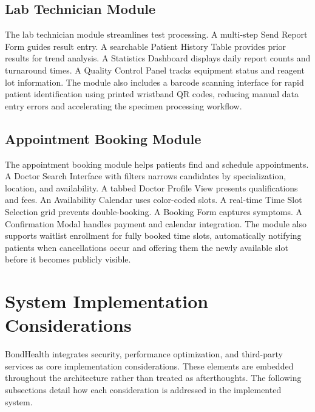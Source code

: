 \subsection{Lab Technician Module}

\justifying
\noindent The lab technician module streamlines test processing. A multi-step Send Report Form guides result entry. A searchable Patient History Table provides prior results for trend analysis. A Statistics Dashboard displays daily report counts and turnaround times. A Quality Control Panel tracks equipment status and reagent lot information. The module also includes a barcode scanning interface for rapid patient identification using printed wristband QR codes, reducing manual data entry errors and accelerating the specimen processing workflow.

\subsection{Appointment Booking Module}

\justifying
\noindent The appointment booking module helps patients find and schedule appointments. A Doctor Search Interface with filters narrows candidates by specialization, location, and availability. A tabbed Doctor Profile View presents qualifications and fees. An Availability Calendar uses color-coded slots. A real-time Time Slot Selection grid prevents double-booking. A Booking Form captures symptoms. A Confirmation Modal handles payment and calendar integration. The module also supports waitlist enrollment for fully booked time slots, automatically notifying patients when cancellations occur and offering them the newly available slot before it becomes publicly visible.


\section{System Implementation Considerations}

\justifying
\noindent BondHealth integrates security, performance optimization, and third-party services as core implementation considerations. These elements are embedded throughout the architecture rather than treated as afterthoughts. The following subsections detail how each consideration is addressed in the implemented system.

